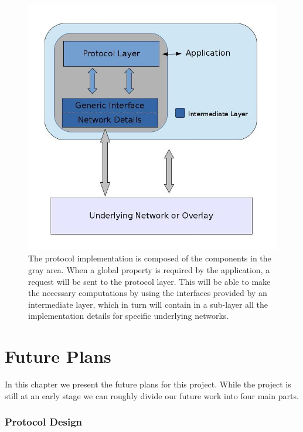 \documentclass[MSc]{icldt}
\begin{document}
\begin{figure}[!h]
   \centering
     \includegraphics[scale=0.5]{../figures/design_overview.jpg}
	 \caption{The protocol implementation is composed of the components in the gray area. When a global property is required by the application, a request will be sent to the protocol layer. This will be able to make the necessary computations by using the interfaces provided by an intermediate layer, which in turn will contain in a sub-layer all the implementation details for specific underlying networks.}
     \label{fig:design_overview}
\end{figure}


\chapter{Future Plans}
\label{sec:progress}

In this chapter we present the future plans for this project. While the project is still at an early stage we can roughly divide our future work into four main parts.

\subsection*{Protocol Design}
\end{document}
